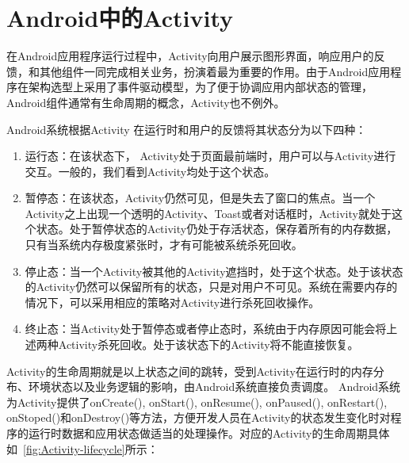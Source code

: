 \section{Android中的Activity}

在Android应用程序运行过程中，Activity向用户展示图形界面，响应用户的反馈，和其他组件一同完成相关业务，扮演着最为重要的作用。由于Android应用程序在架构选型上采用了事件驱动模型，为了便于协调应用内部状态的管理，Android组件通常有生命周期的概念，Activity也不例外。

Android系统根据Activity 在运行时和用户的反馈将其状态分为以下四种：
\begin{enumerate}

\item 运行态：在该状态下， Activity处于页面最前端时，用户可以与Activity进行交互。一般的，我们看到Activity均处于这个状态。

\item 暂停态：在该状态，Activity仍然可见，但是失去了窗口的焦点。当一个Activity之上出现一个透明的Activity、Toast或者对话框时，Activity就处于这个状态。处于暂停状态的Activity仍处于存活状态，保存着所有的内存数据，只有当系统内存极度紧张时，才有可能被系统杀死回收。

\item 停止态：当一个Activity被其他的Activity遮挡时，处于这个状态。处于该状态的Activity仍然可以保留所有的状态，只是对用户不可见。系统在需要内存的情况下，可以采用相应的策略对Activity进行杀死回收操作。

\item 终止态：当Activity处于暂停态或者停止态时，系统由于内存原因可能会将上述两种Activity杀死回收。处于该状态下的Activity将不能直接恢复。
\end{enumerate}

Activity的生命周期就是以上状态之间的跳转，受到Activity在运行时的内存分布、环境状态以及业务逻辑的影响，由Android系统直接负责调度。
Android系统为Activity提供了onCreate(), onStart(), onResume(), onPaused(), onRestart(),  onStoped()和onDestroy()等方法，方便开发人员在Activity的状态发生变化时对程序的运行时数据和应用状态做适当的处理操作。对应的Activity的生命周期具体如~\autoref{fig:Activity-lifecycle}所示：

